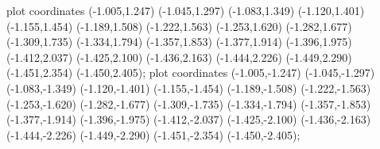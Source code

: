  plot coordinates {(-1.005,1.247) (-1.045,1.297) (-1.083,1.349) (-1.120,1.401) (-1.155,1.454) (-1.189,1.508) (-1.222,1.563) (-1.253,1.620) (-1.282,1.677) (-1.309,1.735) (-1.334,1.794) (-1.357,1.853) (-1.377,1.914) (-1.396,1.975) (-1.412,2.037) (-1.425,2.100) (-1.436,2.163) (-1.444,2.226) (-1.449,2.290) (-1.451,2.354) (-1.450,2.405)};
 plot coordinates {(-1.005,-1.247) (-1.045,-1.297) (-1.083,-1.349) (-1.120,-1.401) (-1.155,-1.454) (-1.189,-1.508) (-1.222,-1.563) (-1.253,-1.620) (-1.282,-1.677) (-1.309,-1.735) (-1.334,-1.794) (-1.357,-1.853) (-1.377,-1.914) (-1.396,-1.975) (-1.412,-2.037) (-1.425,-2.100) (-1.436,-2.163) (-1.444,-2.226) (-1.449,-2.290) (-1.451,-2.354) (-1.450,-2.405)};
